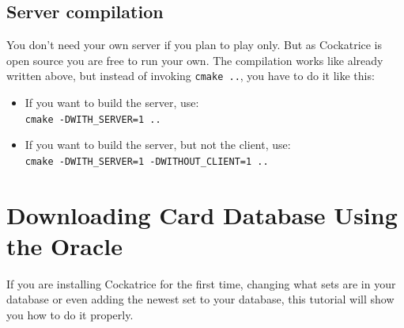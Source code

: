 \documentclass[a4paper]{scrbook}
\newcommand{\shellcmd}[1]{\texttt{\scriptsize #1}}
\begin{document}
\subsection{Server compilation}
You don't need your own server if you plan to play only. But as Cockatrice is open source you are free to run your own.
The compilation works like already written above, but instead of invoking \shellcmd{cmake ..}, you have to do it like this:
\begin{itemize}
 \item If you want to build the server, use:\\ \shellcmd{cmake -DWITH\_SERVER=1 ..}
 \item If you want to build the server, but not the client, use:\\ \shellcmd{cmake -DWITH\_SERVER=1 -DWITHOUT\_CLIENT=1 ..}
\end{itemize}

\section{Downloading Card Database Using the Oracle}
If you are installing Cockatrice for the first time, changing what sets are in your database or even adding the newest set to your database, this tutorial will show you how to do it properly.
\end{document}
